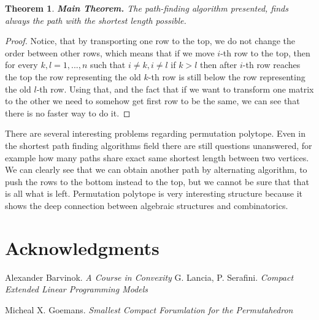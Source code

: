 \documentclass[11pt]{article}
\theoremstyle{plain}
\newtheorem{theorem}[thm]{Theorem}
\theoremstyle{definition}
\begin{document}
\begin{theorem} 
    \textbf{Main Theorem.}
    The path-finding algorithm presented,  finds always the path with the shortest length possible. 
\end{theorem}
\begin{proof}
    Notice, that by transporting one row to the top, we do not change the order between other rows, which means that if we move $i$-th row to the top, then for every $k,l = 1,...,n$ such that $i\neq k, i\neq l$ if $k>l$ then after $i$-th row reaches the top the row representing the old $k$-th row is still below the row representing the old $l$-th row. Using that, and the fact that if we want to transform one matrix to the other we need to somehow get first row to be the same, we can see that there is no faster way to do it.  
\end{proof}

There are several interesting problems regarding permutation polytope. Even in the shortest path finding algorithms field there are still questions unanswered, for example how many paths share exact same shortest length between two vertices. We can clearly see that we can obtain another path by alternating algorithm, to push the rows to the bottom instead to the top, but we cannot be sure that that is all what is left. 
Permutation polytope is very interesting structure because it shows the deep connection between algebraic structures and combinatorics. 

\section*{Acknowledgments}
\begin{thebibliography}{000}
Alexander Barvinok. \emph{A Course in Convexity} 
G. Lancia, P. Serafini. \emph{Compact Extended Linear Programming Models}

Micheal X. Goemans. \emph{Smallest Compact Forumlation for the Permutahedron}




\bigskip
\nopagebreak
\end{thebibliography}
\end{document}
